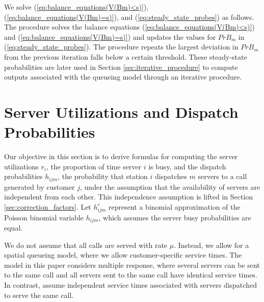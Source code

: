\documentclass[11pt]{article}\topmargin 0mm
\begin{document}
{\color{blue}We solve (\ref{eq:balance_equations(V(Bm)<s)}), (\ref{eq:balance_equations(V(Bm)=s)}), and (\ref{eq:steady_state_probes}) as follows. The procedure solves the balance equations (\ref{eq:balance_equations(V(Bm)<s)}) and (\ref{eq:balance_equations(V(Bm)=s)}) and updates the values for $Pr{B_m}$ in (\ref{eq:steady_state_probes}). The procedure repeats the largest deviation in $Pr{B_m}$ from the previous iteration falls below a certain threshold.} These steady-state probabilities are later used in
Section \ref{sec:iterative_procedure} to compute outputs
associated with the queueing model through an iterative
procedure.






\section{Server Utilizations and Dispatch Probabilities}
\label{sec:dispatch_probabilities} Our objective in this
section is to derive formulas for computing the server
utilizations $r_i$, the proportion of time server $i$ is busy,
and the dispatch probabilities $h_{ijm}$, the probability that
station $i$ dispatches $m$ servers to a call generated by
customer $j$, under the assumption that the availability of
servers are independent from each other. This independence
assumption is lifted in Section \ref{sec:correction_factors}.
Let $h_{ijm}^c$ represent a binomial approximation of the Poisson
binomial variable $h_{ijm}$, which assumes the server busy
probabilities are equal.

We do not assume that all calls are served with rate $\mu$.
Instead, we allow for a spatial queueing model, where we allow
customer-specific service times. The model in this paper
considers multiple response, where several servers can be sent to
the same call and all servers sent to the same call have
identical service times. In contrast, \citet{ChelstBarlach81}
assume independent service times associated with servers
dispatched to serve the same call.
\end{document}
